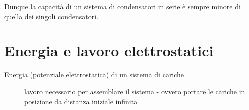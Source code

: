 
Dunque la capacità di un sistema di condensatori in serie è sempre minore di quella dei singoli condensatori.

\section{Energia e lavoro elettrostatici}
\begin{description}
\item[Energia (potenziale elettrostatica) di un sistema di cariche] lavoro necessario per assemblare il sistema - ovvero portare le cariche in posizione da distanza iniziale infinita
\end{description}

